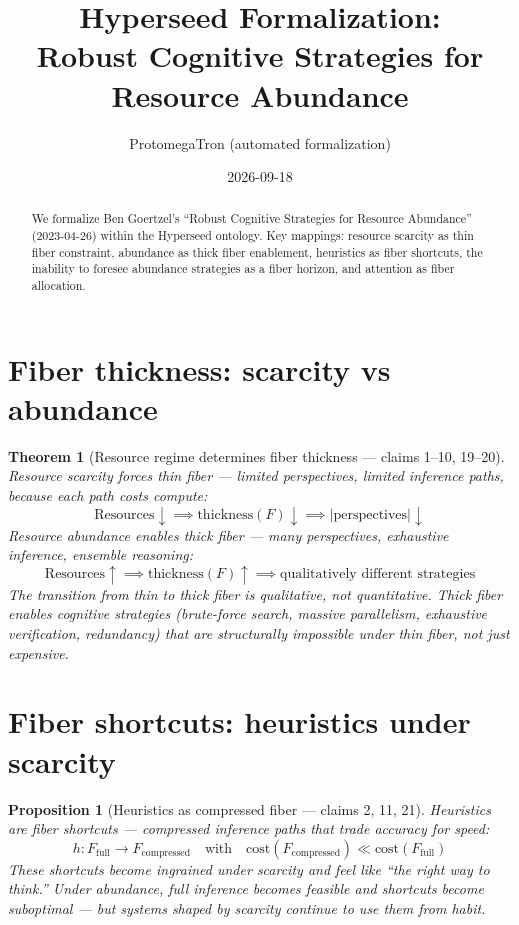 \documentclass[11pt,a4paper]{article}
\title{Hyperseed Formalization:\\
  Robust Cognitive Strategies for Resource Abundance}
\author{ProtomegaTron (automated formalization)}
\date{2026-09-18}
\newtheorem{theorem}[definition]{Theorem}
\newtheorem{proposition}[definition]{Proposition}
\begin{document}
\maketitle

\begin{abstract}
We formalize Ben Goertzel's ``Robust Cognitive Strategies for Resource
Abundance'' (2023-04-26) within the Hyperseed ontology. Key mappings:
resource scarcity as thin fiber constraint, abundance as thick fiber
enablement, heuristics as fiber shortcuts, the inability to foresee
abundance strategies as a fiber horizon, and attention as fiber allocation.
\end{abstract}

\tableofcontents

\section{Fiber thickness: scarcity vs abundance}

\begin{theorem}[Resource regime determines fiber thickness --- claims 1--10, 19--20]
Resource scarcity forces thin fiber --- limited perspectives, limited
inference paths, because each path costs compute:
\[
  \text{Resources} \downarrow \implies \text{thickness}(F) \downarrow
  \implies |\text{perspectives}| \downarrow
\]
Resource abundance enables thick fiber --- many perspectives, exhaustive
inference, ensemble reasoning:
\[
  \text{Resources} \uparrow \implies \text{thickness}(F) \uparrow
  \implies \text{qualitatively different strategies}
\]
The transition from thin to thick fiber is qualitative, not quantitative.
Thick fiber enables cognitive strategies (brute-force search, massive
parallelism, exhaustive verification, redundancy) that are structurally
impossible under thin fiber, not just expensive.
\end{theorem}

\section{Fiber shortcuts: heuristics under scarcity}

\begin{proposition}[Heuristics as compressed fiber --- claims 2, 11, 21]
Heuristics are fiber shortcuts --- compressed inference paths that trade
accuracy for speed:
\[
  h: F_{\text{full}} \to F_{\text{compressed}} \quad \text{with} \quad
  \text{cost}(F_{\text{compressed}}) \ll \text{cost}(F_{\text{full}})
\]
These shortcuts become ingrained under scarcity and feel like ``the right
way to think.'' Under abundance, full inference becomes feasible and
shortcuts become suboptimal --- but systems shaped by scarcity continue
to use them from habit.
\end{proposition}
\end{document}
